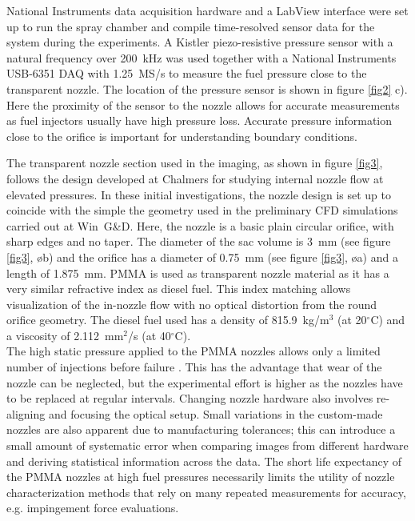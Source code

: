 \documentclass[letterpaper,twocolumn,10pt]{ilass}
\begin{document}
National Instruments data acquisition hardware and a LabView interface were set up to run
the spray chamber and compile time-resolved sensor data for the system during the experiments.
%
A Kistler piezo-resistive pressure sensor with a natural frequency over 200~kHz was used
together with a National Instruments USB-6351 DAQ with 1.25~MS/s to measure the fuel pressure
close to the transparent nozzle. The location of the pressure sensor is shown in figure
\ref{fig2} c).
Here the proximity of the sensor to the nozzle allows for accurate measurements as
fuel injectors usually have high pressure loss. Accurate pressure information close to the
orifice is important for understanding boundary conditions.
%

The transparent nozzle section used in the imaging, as shown in figure \ref{fig3},
follows the design developed at Chalmers for studying internal nozzle flow at elevated
pressures\cite{Falgout2016}.
%
In these initial investigations, the nozzle design is set up to coincide with the
simple the geometry used in the preliminary CFD simulations carried out at Win~G\&D.
%
Here, the nozzle is a basic plain circular orifice, with sharp edges and no taper.
The diameter of the sac volume is 3~mm (see figure \ref{fig3},  {\o b}) and the orifice has a diameter of 0.75~mm (see figure \ref{fig3},  {\o a}) and a length of 1.875~mm.
%
PMMA is used as transparent nozzle material as it has a very similar refractive index as
diesel fuel. This index matching allows visualization of the in-nozzle flow with no optical
distortion from the round orifice geometry. The diesel fuel used has a density of
815.9~kg/m$^3$ (at 20$^{\circ}$C) and a viscosity of 2.112~mm$^2$/s (at 40$^{\circ}$C).\\
%
The high static pressure applied to the PMMA nozzles allows only a limited number of injections
before failure \cite{Falgout2016}. This has the advantage that wear of the nozzle can be
neglected, but the experimental effort is higher as the nozzles have to be replaced at regular
intervals. Changing nozzle hardware also involves re-aligning and focusing the optical setup.
%
Small variations in the custom-made nozzles are also apparent due to manufacturing tolerances; this can introduce a small amount of systematic error when comparing images from different
hardware and deriving statistical information across the data.
%
The short life expectancy of the PMMA nozzles at high fuel pressures necessarily limits
the utility of nozzle characterization methods that rely on many repeated measurements
for accuracy, e.g. impingement force evaluations.
%
\end{document}

